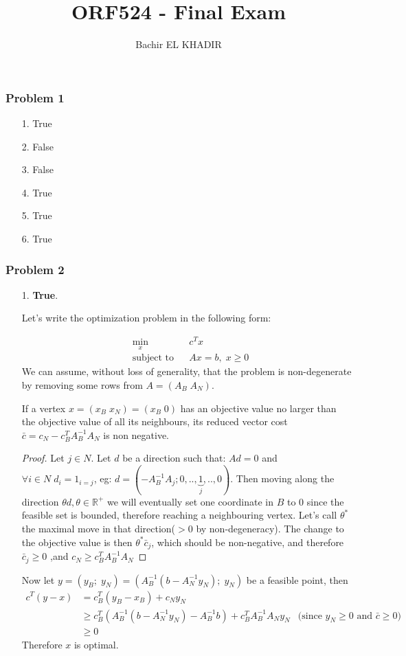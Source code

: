 \documentclass[12pt]{article}
\title{ORF524 - Final Exam}
\author{Bachir EL KHADIR }
\newcommand{\Q}[1]{\subsubsection*{Problem #1}}
\begin{document}
\maketitle

\Q{1}
\begin{enumerate}
\item[1.] True
\item[2.] False
\item[3.] False
\item[4.] True 
\item[5.] True
\item[6.] True
\end{enumerate}

\Q{2}
\begin{enumerate}
\item[1.]
  \textbf{True}.
  
  Let's write the optimization problem in the following form:
  
  \begin{equation*}
    \begin{aligned}
      & \underset{x}{\text{min}}
      & & c^Tx \\
      & \text{subject to}
      & & Ax = b, \; x \ge 0
    \end{aligned}
  \end{equation*}
  We can assume, without loss of generality, that the problem is non-degenerate by removing some rows from $A = (A_B \; A_N)$.
  
  If a vertex $x = (x_B \; x_N)= (x_B \; 0)$ has an objective value no larger than the objective value of all its neighbours, its reduced vector cost $\bar c = c_N - c_B^TA_B^{-1}A_N$ is non negative.
  \begin{proof}    
    Let $j \in N$.  Let $d$ be a direction such that: $Ad = 0$ and $\forall i \in N \; d_i = 1_{i = j}$, eg:
    $d = (-A_B^{-1}A_j; 0, .., \underbrace{1}_j, .., 0)$.
    Then moving along the direction $\theta d, \theta \in \mathbb R^+$
    we will eventually set one coordinate in $B$ to $0$  since the feasible set is bounded, therefore reaching a neighbouring vertex.
    Let's call $\theta^*$ the maximal move in that direction($>0$ by non-degeneracy).  The change to the objective value is then  $\theta^*  \bar c_j$, which should be non-negative, and therefore $\bar c_j \ge 0$ ,and $c_N \ge c_B^TA_B^{-1}A_N$
  \end{proof}
    
  Now let $y = (y_B; \; y_N) = (A_B^{-1}(b - A_N^{-1}y_N); \; y_N)$ be a feasible point, then
  \begin{align*}
    c^T (y-x) &= c_B^T(y_B - x_B) + c_N y_N 
    \\&\ge c_B^T (A_B^{-1}(b - A_N^{-1}y_N) - A_B^{-1}b) + c_B^TA_B^{-1}A_Ny_N &\text{(since $y_N \ge 0$ and $\bar c \ge 0$)}
    \\&\ge 0
  \end{align*}
Therefore $x$ is optimal.
  

\end{enumerate}
\end{document}
